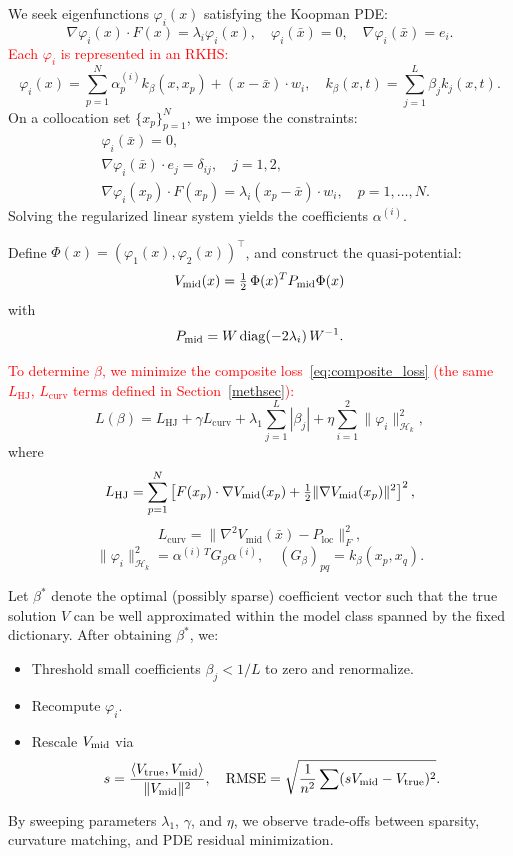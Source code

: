 \documentclass[11pt]{article}
\theoremstyle{plain}      %
\theoremstyle{definition} %
\begin{document}
We seek eigenfunctions \( \varphi_i(x) \) satisfying the Koopman PDE:
\[
\nabla\varphi_i(x) \cdot F(x) = \lambda_i \varphi_i(x), \quad
\varphi_i(\bar{x}) = 0, \quad \nabla\varphi_i(\bar{x}) = e_i.
\]
\textcolor{red}{Each \( \varphi_i \) is represented in an RKHS:}
\[
\varphi_i(x)
= \sum_{p=1}^N \alpha^{(i)}_p k_\beta(x,x_p) + (x - \bar{x}) \cdot w_i,
\quad
k_\beta(x,t) = \sum_{j=1}^L \beta_j k_j(x,t).
\]
On a collocation set \( \{x_p\}_{p=1}^N \), we impose the constraints:
\begin{align*}
&\varphi_i(\bar{x}) = 0, \\
&\nabla\varphi_i(\bar{x}) \cdot e_j = \delta_{ij}, \quad j=1,2, \\
&\nabla\varphi_i(x_p) \cdot F(x_p) = \lambda_i (x_p - \bar{x}) \cdot w_i, \quad p = 1, \dots, N.
\end{align*}
Solving the regularized linear system yields the coefficients \( \alpha^{(i)} \).

Define \( \Phi(x) = (\varphi_1(x), \varphi_2(x))^\top \), and construct the quasi-potential:
\[
V_{\rm mid}(x) = \tfrac12\,\Phi(x)^T P_{\rm mid} \Phi(x)
\]
with
\[
P_{\rm mid} = W\,\mathrm{diag}(-2\lambda_i)\,W^{-1}.
\]

\textcolor{red}{To determine \( \beta \), we minimize the composite loss~\eqref{eq:composite_loss} (the same $L_{\text{HJ}}$, $L_{\text{curv}}$ terms defined in Section~\ref{methsec}):}
\[
L(\beta) = L_{\text{HJ}} + \gamma L_{\text{curv}} + \lambda_1 \sum_{j=1}^L |\beta_j| + \eta \sum_{i=1}^2 \|\varphi_i\|_{\mathcal{H}_k}^2,
\]
where
\[
L_{\text{HJ}} = \sum_{p=1}^N \left[ F(x_p) \cdot \nabla V_{\text{mid}}(x_p)
+ \tfrac12 \|\nabla V_{\rm mid}(x_p)\|^2 \right]^2,
\]
\[
L_{\text{curv}} = \|\nabla^2 V_{\text{mid}}(\bar{x}) - P_{\text{loc}}\|_F^2,
\]
\[
\|\varphi_i\|_{\mathcal{H}_k}^2 = \alpha^{(i)\,T} G_\beta \alpha^{(i)}, \quad (G_\beta)_{pq} = k_\beta(x_p, x_q).
\]

Let $\beta^*$ denote the optimal (possibly sparse) coefficient vector such that the true solution $V$ can be well approximated within the model class spanned by the fixed dictionary. After obtaining \( \beta^* \), we:
\begin{itemize}
  \item Threshold small coefficients \( \beta_j < 1/L \) to zero and renormalize.
  \item Recompute \( \varphi_i \).
  \item Rescale \( V_{\rm mid} \) via
    \[
    s = \frac{\langle V_{\rm true}, V_{\rm mid} \rangle}{\|V_{\rm mid}\|^2}, \quad
    \text{RMSE} = \sqrt{\frac{1}{n^2} \sum (s V_{\rm mid} - V_{\rm true})^2}.
    \]
\end{itemize}
By sweeping parameters \( \lambda_1 \), \( \gamma \), and \( \eta \), we observe trade-offs between sparsity, curvature matching, and PDE residual minimization.
\end{document}

